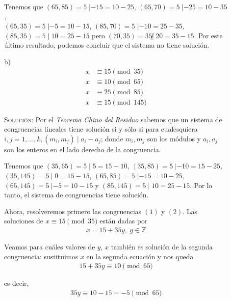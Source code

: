 \documentclass[letterpaper,10pt]{article}
\begin{document}
\begin{enumerate}
\begin{itemize}
        Tenemos que $(65,85) = 5 \; | -15 = 10-25$, $(65, 70) = 5 \; | -25 =
        10-35$, \\ $(65, 35) = 5 \; | -5 = 10-15$, $(85, 70) = 5 \; | -10 = 
        25-35$, $(85, 35)= 5 \; | \; 10 =25-15$ pero $(70, 35) = 35  \not | \;
        20 = 35-15$. Por este último resultado, podemos concluir que el sistema
        no tiene solución.
        
        \item[b)]
        \begin{align}
            x &\equiv 15 \pmod{35} \\
            x &\equiv 10 \pmod{65} \\
            x &\equiv 25 \pmod{85} \\
            x &\equiv 15 \pmod{145}
        \end{align}
        
        \textsc{Solución:} Por el \textit{Teorema Chino del Residuo} sabemos que
        un sistema de congruencias lineales tiene solución si y sólo si para
        cualesquiera $i, j = 1,...,k, (m_{i}, m_{j}) \; | \; a_{i} - a_{j}$;
        donde $m_{i}, m_{j}$ son los módulos y $a_{i}, a_{j}$ son los enteros
        en el lado derecho de la congruencia.
        
        Tenemos que $(35,65) = 5 \; | \; 5 = 15-10$, $(35,85) = 5 \; | -10 
        = 15-25$, \\ $(35,145) = 5 \; | \; 0 = 15-15$, $(65,85) = 5 \; | -15
        = 10-25$, $(65,145) = 5 \; | -5 = 10-15$ y $(85, 145) = 5 \; | \; 10
        = 25-15 $. Por lo tanto, el sistema de congruencias tiene solución.
        
        Ahora, resolveremos primero las congruencias $(1)$ y $(2)$. Las
        soluciones de $x \equiv 15 \pmod{35}$ están dadas por 
        \begin{align}
            x = 15 + 35y, \; y \in \mathbb{Z}
        \end{align}
        
        Veamos para cuáles valores de $y$, $x$ también es solución de la
        segunda congruencia: sustituimos $x$ en la segunda ecuación y nos
        queda 
        \begin{align*}
            15 + 35y \equiv 10 \pmod{65} 
        \end{align*}
        
        es decir, 
        \begin{align*}
            35y \equiv 10-15 = -5 \pmod{65}
        \end{align*}
        

\end{itemize}
\end{enumerate}
\end{document}

